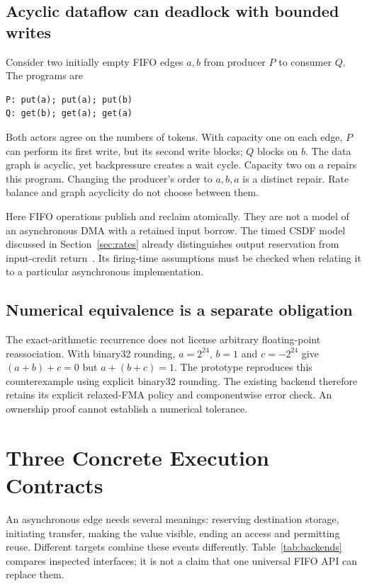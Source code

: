 \documentclass[final,3p,times,authoryear]{elsarticle}
\begin{document}
\subsection{Acyclic dataflow can deadlock with bounded writes}\label{sec:deadlock}
Consider two initially empty FIFO edges $a,b$ from producer $P$ to consumer $Q$. The programs are

\begin{lstlisting}[float=htbp,caption={A balanced but incompatible stream order.}]
P: put(a); put(a); put(b)
Q: get(b); get(a); get(a)
\end{lstlisting}

Both actors agree on the numbers of tokens. With capacity one on each edge, $P$ can perform its first write, but its second write blocks; $Q$ blocks on $b$. The data graph is acyclic, yet backpressure creates a wait cycle. Capacity two on $a$ repairs this program. Changing the producer's order to $a,b,a$ is a distinct repair. Rate balance and graph acyclicity do not choose between them.

Here FIFO operations publish and reclaim atomically. They are not a model of an asynchronous DMA with a retained input borrow. The timed CSDF model discussed in Section~\ref{sec:rates} already distinguishes output reservation from input-credit return~\citep{stuijk2008}. Its firing-time assumptions must be checked when relating it to a particular asynchronous implementation.

\subsection{Numerical equivalence is a separate obligation}
The exact-arithmetic recurrence does not license arbitrary floating-point reassociation. With binary32 rounding, $a=2^{24}$, $b=1$ and $c=-2^{24}$ give $(a+b)+c=0$ but $a+(b+c)=1$. The prototype reproduces this counterexample using explicit binary32 rounding. The existing backend therefore retains its explicit relaxed-FMA policy and componentwise error check. An ownership proof cannot establish a numerical tolerance.



\section{Three Concrete Execution Contracts}\label{sec:backends}
An asynchronous edge needs several meanings: reserving destination storage, initiating transfer, making the value visible, ending an access and permitting reuse. Different targets combine these events differently. Table~\ref{tab:backends} compares inspected interfaces; it is not a claim that one universal FIFO API can replace them.
\end{document}
